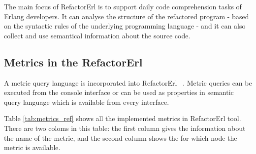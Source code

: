 The main focus of RefactorErl is to support daily code comprehension tasks of Erlang developers. It can analyse the structure of the refactored program - based on the syntactic rules of the underlying programming language - and it can also collect and use semantical information about the source code.

\subsection{Metrics in the RefactorErl}

A metric query language is incorporated into RefactorErl~\cite{refactorerl} . Metric queries can be executed from the console interface or can be used as properties in semantic query language which is available from every interface.

Table \ref{tab:metrics_ref} shows all the implemented metrics in RefactorErl tool. There are two coloms in this table: the first column gives the information about the name of the metric, and the second column shows the for which node the metric is available.

